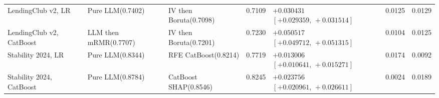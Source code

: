 \documentclass[final,5p,twocolumn]{elsarticle}
\begin{document}
\begin{table}[htbp]
\begin{threeparttable}
\begin{tabular}{@{}L{24mm}L{27mm}L{24mm}rL{38mm}rr@{}}
\addlinespace
LendingClub v2, LR & Pure LLM\newline (0.7402) & IV then Boruta\newline (0.7098) & 0.7109 & $+0.030431$\newline $[+0.029359,\,+0.031514]$ & 0.0125 & 0.0129 \\
\addlinespace
LendingClub v2, CatBoost & LLM then mRMR\newline (0.7707) & IV then Boruta\newline (0.7201) & 0.7230 & $+0.050517$\newline $[+0.049712,\,+0.051315]$ & 0.0104 & 0.0125 \\
\addlinespace
Stability 2024, LR & Pure LLM\newline (0.8344) & RFE CatBoost\newline (0.8214) & 0.7719 & $+0.013006$\newline $[+0.010641,\,+0.015271]$ & 0.0174 & 0.0092 \\
\addlinespace
Stability 2024, CatBoost & Pure LLM\newline (0.8784) & CatBoost SHAP\newline (0.8546) & 0.8245 & $+0.023756$\newline $[+0.020961,\,+0.026611]$ & 0.0024 & 0.0189 \\
\bottomrule
\end{tabular}
\end{threeparttable}
\end{table}
\end{document}
